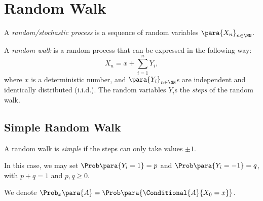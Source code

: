 \section{Random Walk}

\begin{definition}
    \label{def:random-stochastic-process}%
    A \emph{random/stochastic process} is a sequence of random variables \(\para{X_n}_{n \in \NN}\).
\end{definition}

\begin{definition}
    \label{def:random-walk}%
    A \emph{random walk} is a random process that can be expressed in the following way:
    \[
        X_n = x + \sum_{i = 1}^{n} Y_i,
    \]
    where \(x\) is a deterministic number, and \(\para{Y_i}_{n \in \NN}\)s are independent and identically distributed (i.i.d.). The random variables \(Y_i\)s the \emph{steps} of the random walk.
\end{definition}

\subsection{Simple Random Walk}

\begin{definition}
    \label{def:simple-random-walk}%
    A random walk is \emph{simple} if the steps can only take values \(\pm 1\).
\end{definition}

In this case, we may set \(\Prob\para{Y_i = 1} = p\) and \(\Prob\para{Y_i = -1} = q\), with \(p + q = 1\) and \(p, q \geq 0\).

\begin{notation}
    We denote \(\Prob_x\para{A} = \Prob\para{\Conditional{A}{X_0 = x}}\).
\end{notation}

